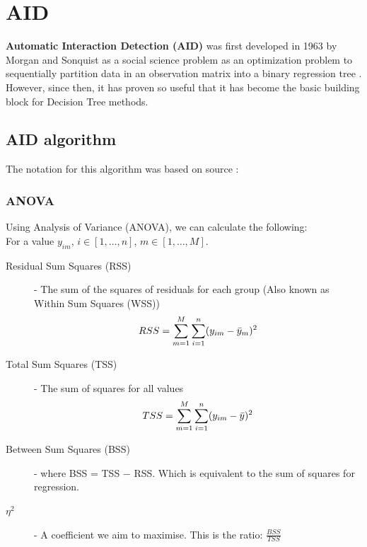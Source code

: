 \documentclass[11pt,a4paper]{report}
\begin{document}
\section{AID}
\textbf{Automatic Interaction Detection (AID)} was first developed in 1963 by Morgan and Sonquist as a social science problem\cite{AID} as an optimization problem to sequentially partition data in an observation matrix into a binary regression tree \cite{ORAID}.
However, since then, it has proven so useful that it has become the basic building block for Decision Tree methods.

\subsection{AID algorithm}
The notation for this algorithm was based on source \cite{EarlyTree}:

\subsubsection{ANOVA}
Using Analysis of Variance (ANOVA), we can calculate the following:
\medskip\\
For a value $y_{im}$, $i \in [1,\dots,n]$, $m \in [1,\dots,M]$.
\begin{description}
    \item[Residual Sum Squares (RSS)] - The sum of the squares of residuals for each group (Also known as Within Sum Squares (WSS))
    \begin{equation}
        RSS = \sum_{m=1}^{M} \sum_{i=1}^{n} (y_{im} - \Bar{y}_{m})^{2}
    \end{equation}
    \item[Total Sum Squares (TSS)] - The sum of squares for all values
    \begin{equation}
        TSS = \sum_{m=1}^{M} \sum_{i=1}^{n} (y_{im} - \Bar{y})^{2}
    \end{equation}
    \item[Between Sum Squares (BSS)] - where BSS = TSS $-$ RSS. Which is equivalent to the sum of squares for regression.
    \item[$\eta^2$] - A coefficient we aim to maximise. This is the ratio: $\frac{BSS}{TSS}$
\end{description}
\end{document}

